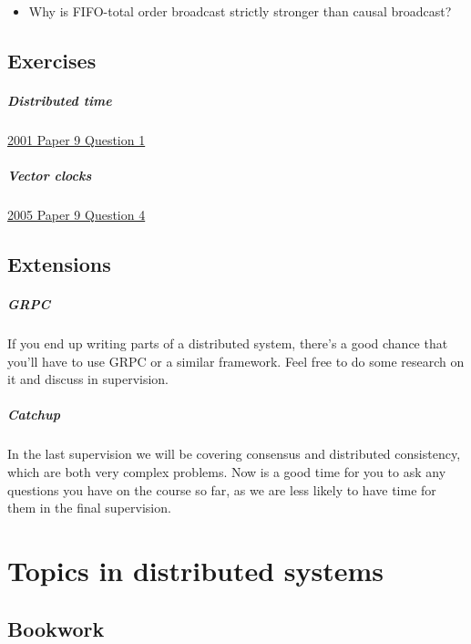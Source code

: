 \documentclass[12pt,a4paper,oneside,openright]{report}
\newcommand{\question}[2]{\paragraph{#1} #2}
\begin{document}
{\begin{itemize}
    schemes presented in the course, why they might be useful, and how
    they can be implemented.
  \item Why is FIFO-total order broadcast strictly stronger than
    causal broadcast?
  \end{itemize}
}

\section{Exercises}

\question{Distributed
  time}{\href{https://www.cl.cam.ac.uk/teaching/exams/pastpapers/y2001p9q1.pdf}{2001
    Paper 9 Question 1}}

\question{Vector
  clocks}{\href{https://www.cl.cam.ac.uk/teaching/exams/pastpapers/y2005p9q4.pdf}{2005
    Paper 9 Question 4}}


\section{Extensions}

\question{GRPC}{If you end up writing parts of a distributed system,
  there's a good chance that you'll have to use GRPC or a similar
  framework. Feel free to do some research on it and discuss in
  supervision.}

\question{Catchup}{In the last supervision we will be covering
  consensus and distributed consistency, which are both very complex
  problems. Now is a good time for you to ask any questions you have
  on the course so far, as we are less likely to have time for them in
  the final supervision.}


\chapter{Topics in distributed systems}

\section{Bookwork}
\end{document}
